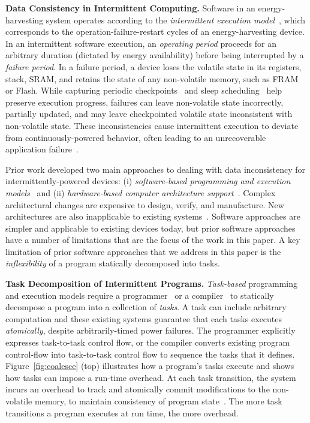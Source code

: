 \textbf{Data Consistency in Intermittent Computing.}  Software in an
energy-harvesting system operates according to the {\em intermittent execution
model}~\citep{dino,lucia_snapl_2017}, which corresponds to the
operation-failure-restart cycles of an energy-harvesting device. In an
intermittent software execution, an {\em operating period} proceeds for an
arbitrary duration (dictated by energy availability) before being interrupted
by a {\em failure period}. In a failure period, a device loses the volatile
state in its registers, stack, SRAM, and retains the state of any non-volatile
memory, such as FRAM or Flash. While capturing periodic
checkpoints~\citep{mementos,quickrecall} and sleep
scheduling~\citep{dewdrop,hibernus,hibernusplusplus} help preserve execution
progress, failures can leave non-volatile state incorrectly, partially updated,
and may leave checkpointed volatile state inconsistent with non-volatile state.
These inconsistencies cause intermittent execution to deviate from
continuously-powered behavior, often leading to an unrecoverable
application failure~\citep{dino,edb}. 

Prior work developed two main approaches to dealing with data inconsistency for
intermittently-powered devices: (i) \emph{software-based programming and
execution models}~\citep{dino,ratchet,chain,alpaca} and (ii)
\emph{hardware-based computer architecture
support}~\citep{hicks_isca_2017,idetic,nvp}.  Complex architectural changes are
expensive to design, verify, and manufacture.  New architectures are also
inapplicable to existing systems~\citep{hicks_isca_2017,nvp}. Software
approaches are simpler and applicable to existing devices today, but prior
software approaches have a number of limitations that are the focus of the work
in this paper.  A key limitation of prior software approaches that we address in this paper is the {\em inflexibility} of a program statically decomposed into tasks. 

\textbf{Task Decomposition of Intermittent Programs.} {\em
Task-based} programming and execution models require a
programmer~\citep{alpaca,chain} or a compiler~\cite{baghsorkhi_cgo_2018} to
statically decompose a program into a collection of {\em tasks}.  A task can
include arbitrary computation and these existing systems guarantee that each
tasks executes {\em atomically}, despite arbitrarily-timed power failures.  
%
The programmer explicitly expresses task-to-task control flow, or the compiler
converts existing program control-flow into task-to-task control flow to sequence 
the tasks that it defines.
%
Figure~\ref{fig:coalesce} (top) illustrates how a program's tasks execute and
shows how tasks can impose a run-time overhead. 
%
At each task transition, the system incurs an overhead to track and atomically
commit modifications to the non-volatile memory, to maintain consistency of
program state~\citep{chain,alpaca}.  
%
The more task transitions a program executes at run time, the more overhead.

